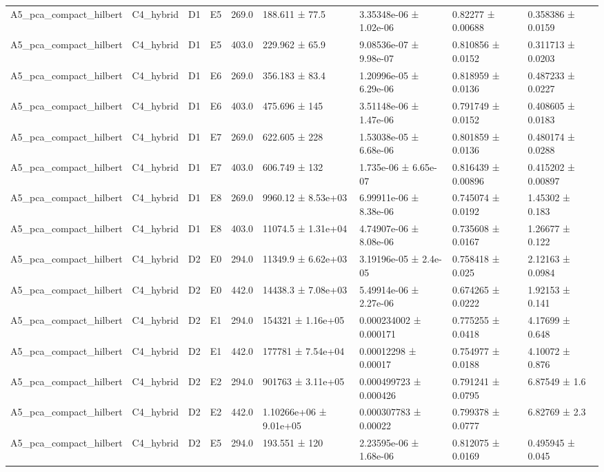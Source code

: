 \begin{table}
\begin{tabular}{lllllllll}
A5\_pca\_compact\_hilbert & C4\_hybrid & D1 & E5 & 269.0 & 188.611 ± 77.5 & 3.35348e-06 ± 1.02e-06 & 0.82277 ± 0.00688 & 0.358386 ± 0.0159 \\
A5\_pca\_compact\_hilbert & C4\_hybrid & D1 & E5 & 403.0 & 229.962 ± 65.9 & 9.08536e-07 ± 9.98e-07 & 0.810856 ± 0.0152 & 0.311713 ± 0.0203 \\
A5\_pca\_compact\_hilbert & C4\_hybrid & D1 & E6 & 269.0 & 356.183 ± 83.4 & 1.20996e-05 ± 6.29e-06 & 0.818959 ± 0.0136 & 0.487233 ± 0.0227 \\
A5\_pca\_compact\_hilbert & C4\_hybrid & D1 & E6 & 403.0 & 475.696 ± 145 & 3.51148e-06 ± 1.47e-06 & 0.791749 ± 0.0152 & 0.408605 ± 0.0183 \\
A5\_pca\_compact\_hilbert & C4\_hybrid & D1 & E7 & 269.0 & 622.605 ± 228 & 1.53038e-05 ± 6.68e-06 & 0.801859 ± 0.0136 & 0.480174 ± 0.0288 \\
A5\_pca\_compact\_hilbert & C4\_hybrid & D1 & E7 & 403.0 & 606.749 ± 132 & 1.735e-06 ± 6.65e-07 & 0.816439 ± 0.00896 & 0.415202 ± 0.00897 \\
A5\_pca\_compact\_hilbert & C4\_hybrid & D1 & E8 & 269.0 & 9960.12 ± 8.53e+03 & 6.99911e-06 ± 8.38e-06 & 0.745074 ± 0.0192 & 1.45302 ± 0.183 \\
A5\_pca\_compact\_hilbert & C4\_hybrid & D1 & E8 & 403.0 & 11074.5 ± 1.31e+04 & 4.74907e-06 ± 8.08e-06 & 0.735608 ± 0.0167 & 1.26677 ± 0.122 \\
A5\_pca\_compact\_hilbert & C4\_hybrid & D2 & E0 & 294.0 & 11349.9 ± 6.62e+03 & 3.19196e-05 ± 2.4e-05 & 0.758418 ± 0.025 & 2.12163 ± 0.0984 \\
A5\_pca\_compact\_hilbert & C4\_hybrid & D2 & E0 & 442.0 & 14438.3 ± 7.08e+03 & 5.49914e-06 ± 2.27e-06 & 0.674265 ± 0.0222 & 1.92153 ± 0.141 \\
A5\_pca\_compact\_hilbert & C4\_hybrid & D2 & E1 & 294.0 & 154321 ± 1.16e+05 & 0.000234002 ± 0.000171 & 0.775255 ± 0.0418 & 4.17699 ± 0.648 \\
A5\_pca\_compact\_hilbert & C4\_hybrid & D2 & E1 & 442.0 & 177781 ± 7.54e+04 & 0.00012298 ± 0.00017 & 0.754977 ± 0.0188 & 4.10072 ± 0.876 \\
A5\_pca\_compact\_hilbert & C4\_hybrid & D2 & E2 & 294.0 & 901763 ± 3.11e+05 & 0.000499723 ± 0.000426 & 0.791241 ± 0.0795 & 6.87549 ± 1.6 \\
A5\_pca\_compact\_hilbert & C4\_hybrid & D2 & E2 & 442.0 & 1.10266e+06 ± 9.01e+05 & 0.000307783 ± 0.00022 & 0.799378 ± 0.0777 & 6.82769 ± 2.3 \\
A5\_pca\_compact\_hilbert & C4\_hybrid & D2 & E5 & 294.0 & 193.551 ± 120 & 2.23595e-06 ± 1.68e-06 & 0.812075 ± 0.0169 & 0.495945 ± 0.045 \\

\end{tabular}
\end{table}

